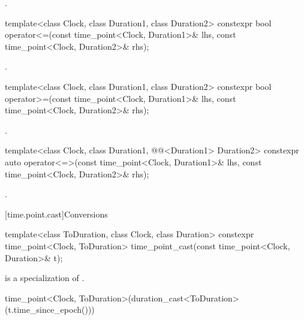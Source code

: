 \begin{itemdescr}
\pnum
\returns
{}.
\end{itemdescr}

%
\begin{itemdecl}
template<class Clock, class Duration1, class Duration2>
  constexpr bool operator<=(const time_point<Clock, Duration1>& lhs,
                            const time_point<Clock, Duration2>& rhs);
\end{itemdecl}

\begin{itemdescr}
\pnum
\returns
{}.
\end{itemdescr}

%
\begin{itemdecl}
template<class Clock, class Duration1, class Duration2>
  constexpr bool operator>=(const time_point<Clock, Duration1>& lhs,
                            const time_point<Clock, Duration2>& rhs);
\end{itemdecl}

\begin{itemdescr}
\pnum
\returns
{}.
\end{itemdescr}

%
\begin{itemdecl}
template<class Clock, class Duration1,
         @@<Duration1> Duration2>
  constexpr auto operator<=>(const time_point<Clock, Duration1>& lhs,
                             const time_point<Clock, Duration2>& rhs);
\end{itemdecl}

\begin{itemdescr}
\pnum
\returns
{}.
\end{itemdescr}

[time.point.cast]{Conversions}

%
%
\begin{itemdecl}
template<class ToDuration, class Clock, class Duration>
  constexpr time_point<Clock, ToDuration> time_point_cast(const time_point<Clock, Duration>& t);
\end{itemdecl}

\begin{itemdescr}
\pnum
\constraints
{} is a specialization of .

\pnum
\returns
\begin{codeblock}
time_point<Clock, ToDuration>(duration_cast<ToDuration>(t.time_since_epoch()))
\end{codeblock}
\end{itemdescr}


